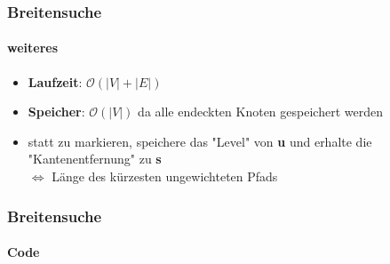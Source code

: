 \begin{frame}
    \frametitle{Breitensuche}
    \framesubtitle{weiteres}
    \begin{itemize}
        \item \textbf{Laufzeit}: \( \mathcal{O}(|V| + |E|)\)
        \item \textbf{Speicher}: \( \mathcal{O}(|V|)\) da alle endeckten Knoten gespeichert werden
        \item statt zu markieren, speichere das "Level" von \textbf{u} und erhalte die "Kantenentfernung" zu \textbf{s} \\\(\iff\) Länge des kürzesten ungewichteten Pfads \\ 
    \end{itemize}
\end{frame}
\begin{frame}
    \frametitle{Breitensuche}
    \framesubtitle{Code}
    
\end{frame}
